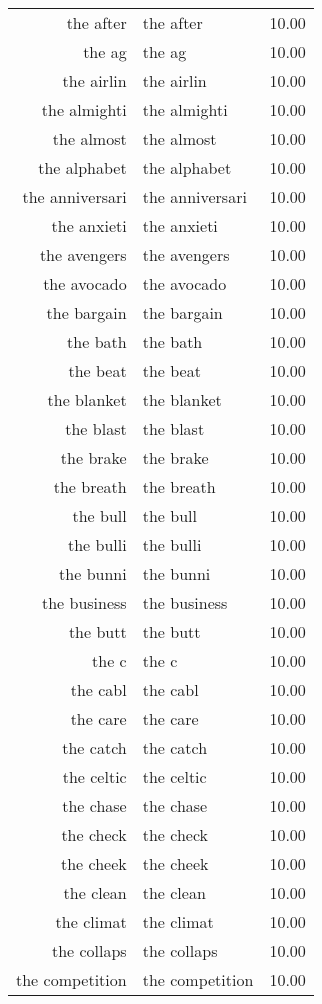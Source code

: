 \begin{table}[ht]
\begin{tabular}{rlr}
  the after & the after & 10.00 \\ 
  the ag & the ag & 10.00 \\ 
  the airlin & the airlin & 10.00 \\ 
  the almighti & the almighti & 10.00 \\ 
  the almost & the almost & 10.00 \\ 
  the alphabet & the alphabet & 10.00 \\ 
  the anniversari & the anniversari & 10.00 \\ 
  the anxieti & the anxieti & 10.00 \\ 
  the avengers & the avengers & 10.00 \\ 
  the avocado & the avocado & 10.00 \\ 
  the bargain & the bargain & 10.00 \\ 
  the bath & the bath & 10.00 \\ 
  the beat & the beat & 10.00 \\ 
  the blanket & the blanket & 10.00 \\ 
  the blast & the blast & 10.00 \\ 
  the brake & the brake & 10.00 \\ 
  the breath & the breath & 10.00 \\ 
  the bull & the bull & 10.00 \\ 
  the bulli & the bulli & 10.00 \\ 
  the bunni & the bunni & 10.00 \\ 
  the business & the business & 10.00 \\ 
  the butt & the butt & 10.00 \\ 
  the c & the c & 10.00 \\ 
  the cabl & the cabl & 10.00 \\ 
  the care & the care & 10.00 \\ 
  the catch & the catch & 10.00 \\ 
  the celtic & the celtic & 10.00 \\ 
  the chase & the chase & 10.00 \\ 
  the check & the check & 10.00 \\ 
  the cheek & the cheek & 10.00 \\ 
  the clean & the clean & 10.00 \\ 
  the climat & the climat & 10.00 \\ 
  the collaps & the collaps & 10.00 \\ 
  the competition & the competition & 10.00 \\ 

\end{tabular}
\end{table}
